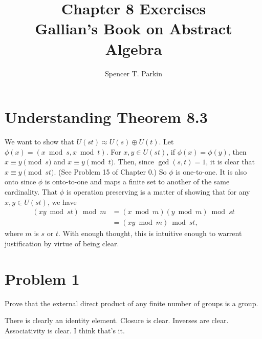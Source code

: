 \documentclass[12pt]{article}
\title{Chapter 8 Exercises\\Gallian's Book on Abstract Algebra}
\author{Spencer T. Parkin}
\begin{document}
\maketitle

\section*{Understanding Theorem 8.3}

We want to show that $U(st)\approx U(s)\oplus U(t)$.
Let $\phi(x)=(x\bmod s,x\bmod t)$.
For $x,y\in U(st)$, if $\phi(x)=\phi(y)$,
then $x\equiv y\pmod s$ and $x\equiv y\pmod t$.
Then, since $\gcd(s,t)=1$, it is clear that $x\equiv y\pmod{st}$.
(See Problem 15 of Chapter 0.)  So $\phi$ is one-to-one.
It is also onto since $\phi$ is onto-to-one and maps a finite
set to another of the same cardinality.  That $\phi$ is
operation preserving is a matter of showing that for
any $x,y\in U(st)$, we have
\begin{align*}
(xy\bmod st)\bmod m &= (x\bmod m)(y\bmod m)\bmod st \\
 &= (xy\bmod m)\bmod st,
\end{align*}
where $m$ is $s$ or $t$.  With enough thought, this is
intuitive enough to warrent justification by virtue of being clear.

\section*{Problem 1}

Prove that the external direct product of any finite number of groups is a group.

There is clearly an identity element.  Closure is clear.  Inverses are clear.
Associativity is clear.  I think that's it.
\end{document}
